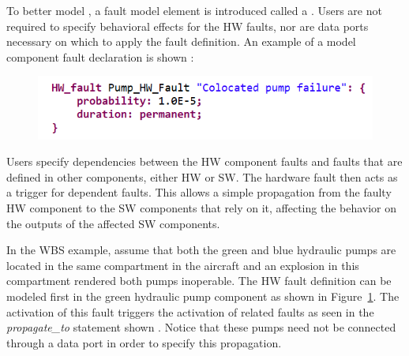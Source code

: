 To better model %
, a fault model element is introduced called a . Users are not required to specify behavioral effects for the HW faults, nor are data ports necessary on which to apply the fault definition. An example of a model component fault declaration is shown :
\begin{figure}[h!]
	\vspace{-0.2in}
	\begin{center}
	\includegraphics[width=.7\textwidth]{images/hw_fault2.png}
	\end{center}
	\vspace{-0.3in}
	\label{fig:hwFault}
	\vspace{-0.1in}
\end{figure}

Users specify dependencies between the HW component faults and faults that are defined in other components, either HW or SW. The hardware fault then acts as a trigger for dependent faults. This allows a simple propagation from the faulty HW component to the SW components that rely on it, affecting the behavior on the outputs of the affected SW components.

In the WBS example, assume that both the green and blue hydraulic pumps are located in the same compartment in the aircraft and an explosion in this compartment rendered both pumps inoperable.
The HW fault definition can be modeled first in the green hydraulic pump component as shown in Figure~\ref{fig:hwFault}. The activation of this fault triggers the activation of related faults as seen in the \textit{propagate\_to} statement shown . %
Notice that these pumps need not be connected through a data port in order to specify this propagation. %

